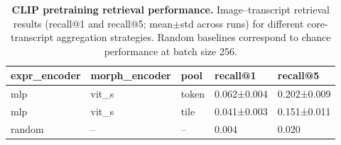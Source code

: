 \begin{table}
\centering
\caption{\textbf{CLIP pretraining retrieval performance.} Image--transcript retrieval results (recall@1 and recall@5; mean$\pm$std across runs) for different core-transcript aggregation strategies. Random baselines correspond to chance performance at batch size 256.}
\label{tab:p-fus:clip-results}
\begin{tabular}{lllll}
\toprule
expr\_encoder & morph\_encoder & pool & recall@1 & recall@5 \\
\midrule
mlp & vit\_s & token & 0.062±0.004 & 0.202±0.009 \\
mlp & vit\_s & tile  & 0.041±0.003 & 0.151±0.011 \\
\midrule
random & -- & -- & 0.004 & 0.020 \\
\bottomrule
\end{tabular}
\end{table}